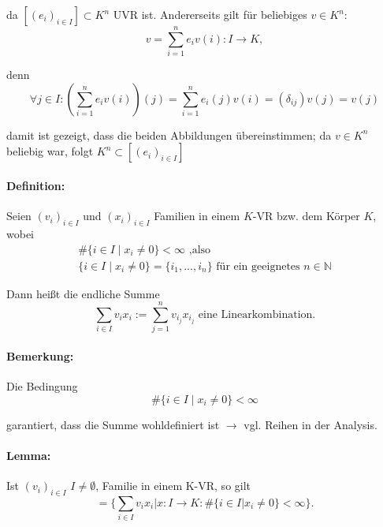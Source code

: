 	da $[(e_i)_{i\in I}] \subset K^n$ UVR ist. Andererseits gilt für beliebiges $v\in K^n$:
	\begin{equation*}
		v=\sum^n_{i=1}e_iv(i): I\to K,
	\end{equation*}
	
	denn
	\begin{equation*}
		\forall j\in I: \left(\sum^n_{i=1} e_iv(i)\right)(j) = \sum^n_{i=1}e_i(j)v(i) = (\delta_{ij}) v(j) = v(j)
	\end{equation*}
	
	damit ist gezeigt, dass die beiden Abbildungen übereinstimmen; da $v\in K^n$ beliebig war, folgt $K^n \subset [(e_i)_{i\in I}]$
	
\paragraph{Definition:}
	Seien $(v_i)_{i\in I}$ und $(x_i)_{i\in I}$ Familien in einem $ K $-VR bzw. dem Körper $ K $, wobei
	\begin{gather*}
		\# \{i\in I\mid x_i \neq 0\} < \infty\text{ ,also}\\
		\{ i\in I \mid x_i \neq 0\} = \{i_1,...,i_n\}\text{ für ein geeignetes } n\in \mathbb{N}
	\end{gather*}
	
	
	Dann heißt die endliche Summe
	\begin{equation*}
    	\sum_{i\in I} v_ix_i:= \sum^n_{j=1}v_{i_j}x_{i_j}\text{ eine Linearkombination.}
	\end{equation*}

\paragraph{Bemerkung:}
	Die Bedingung
	\begin{equation*}
		\#\{i\in I \mid x_i\neq 0\} <\infty
	\end{equation*}
	
	garantiert, dass die Summe wohldefiniert ist $\rightarrow$ vgl. Reihen in der Analysis.
		
\paragraph{Lemma:}
	Ist $(v_i)_{i\in I}$ $I \neq \emptyset$, Familie in einem K-VR, so gilt 
	\begin{equation*}
		[(v_i)_{i\in I}] = \{\sum_{i\in I} v_ix_i| x: I\to K: \# \{i\in I| x_i \neq 0\}< \infty\}.
	\end{equation*}
	
